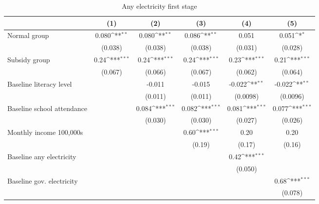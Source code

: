 \begin{table}[htbp]\centering
\def\sym#1{\ifmmode^{#1}\else\(^{#1}\)\fi}
\caption{Any electricity first stage}
\begin{tabular*}{1\hsize}{@{\hskip\tabcolsep\extracolsep\fill}l*{5}{c}}
\toprule
                &\multicolumn{1}{c}{(1)}         &\multicolumn{1}{c}{(2)}         &\multicolumn{1}{c}{(3)}         &\multicolumn{1}{c}{(4)}         &\multicolumn{1}{c}{(5)}         \\
\midrule
Normal group    &    0.080\sym{**} &    0.080\sym{**} &    0.086\sym{**} &    0.051         &    0.051\sym{*}  \\
                &  (0.038)         &  (0.038)         &  (0.038)         &  (0.031)         &  (0.028)         \\
Subsidy group   &     0.24\sym{***}&     0.24\sym{***}&     0.24\sym{***}&     0.23\sym{***}&     0.21\sym{***}\\
                &  (0.067)         &  (0.066)         &  (0.067)         &  (0.062)         &  (0.064)         \\
Baseline literacy level&                  &   -0.011         &   -0.015         &   -0.022\sym{**} &   -0.022\sym{**} \\
                &                  &  (0.011)         &  (0.011)         & (0.0098)         & (0.0096)         \\
Baseline school attendance&                  &    0.084\sym{***}&    0.082\sym{***}&    0.081\sym{***}&    0.077\sym{***}\\
                &                  &  (0.030)         &  (0.030)         &  (0.027)         &  (0.026)         \\
Monthly income 100,000s&                  &                  &     0.60\sym{***}&     0.20         &     0.20         \\
                &                  &                  &   (0.19)         &   (0.17)         &   (0.16)         \\
Baseline any electricity&                  &                  &                  &     0.42\sym{***}&                  \\
                &                  &                  &                  &  (0.050)         &                  \\
Baseline gov. electricity&                  &                  &                  &                  &     0.68\sym{***}\\
                &                  &                  &                  &                  &  (0.078)         \\

\end{tabular*}
\end{table}
